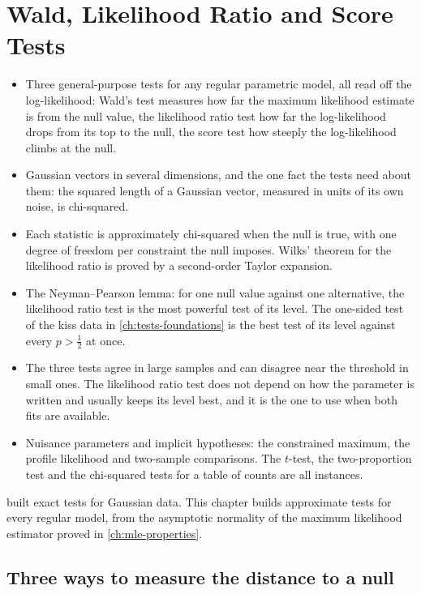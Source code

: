 \chapter{Wald, Likelihood Ratio and Score Tests}
\label{ch:wald-lrt}

\begin{chaptergoals}
\begin{itemize}[nosep]
\item Three general-purpose tests for any regular parametric model, all read off the log-likelihood: Wald's test measures how far the maximum likelihood estimate is from the null value, the likelihood ratio test how far the log-likelihood drops from its top to the null, the score test how steeply the log-likelihood climbs at the null.
\item Gaussian vectors in several dimensions, and the one fact the tests need about them: the squared length of a Gaussian vector, measured in units of its own noise, is chi-squared.
\item Each statistic is approximately chi-squared when the null is true, with one degree of freedom per constraint the null imposes. Wilks' theorem for the likelihood ratio is proved by a second-order Taylor expansion.
\item The Neyman--Pearson lemma: for one null value against one alternative, the likelihood ratio test is the most powerful test of its level. The one-sided test of the kiss data in \cref{ch:tests-foundations} is the best test of its level against every $p > \frac12$ at once.
\item The three tests agree in large samples and can disagree near the threshold in small ones. The likelihood ratio test does not depend on how the parameter is written and usually keeps its level best, and it is the one to use when both fits are available.
\item Nuisance parameters and implicit hypotheses: the constrained maximum, the profile likelihood and two-sample comparisons. The $t$-test, the two-proportion test and the chi-squared tests for a table of counts are all instances.
\end{itemize}
 built exact tests for Gaussian data. This chapter builds approximate tests for every regular model, from the asymptotic normality of the maximum likelihood estimator proved in \cref{ch:mle-properties}.
\end{chaptergoals}

\section{Three ways to measure the distance to a null}
\label{sec:wlr-three}

